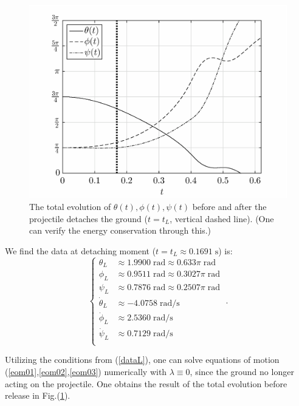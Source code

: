 \documentclass[%
reprint,
amsmath,amssymb,
aps,
]{revtex4-1}
\begin{document}
	\begin{figure}[h]
		\centering
		\includegraphics[scale=0.34]{ulttot.eps}
		\caption{The total evolution of $\theta(t),\phi(t),\psi(t)$ before and after the projectile detaches the ground ($t = t_L$, vertical dashed line). (One can verify the energy conservation through this.)} 
		\label{ultddyn}
	\end{figure}
	
	We find the data at detaching moment ($t=t_L\approx 0.1691\;\mathrm{s}$) is:
	\begin{equation}\label{dataL}
	\left\{
	\begin{aligned}
	\theta_L &\approx 1.9900\;\mathrm{rad} \approx 0.633\pi\;\mathrm{rad}
	\\
	\phi_L &\approx 0.9511\;\mathrm{rad}\approx 0.3027\pi\;\mathrm{rad}
	\\
	\psi_L &\approx 0.7876\;\mathrm{rad} \approx 0.2507\pi\;\mathrm{rad}
	\\
	\dot{\theta}_L &\approx -4.0758\;\mathrm{rad/s}\\
	\dot{\phi}_L &\approx 2.5360\;\mathrm{rad/s}\\
	\dot{\psi}_L &\approx 0.7129\;\mathrm{rad/s}\\
	\end{aligned}\right.\;.
	\end{equation}
	
	Utilizing the conditions from (\ref{dataL}), one can solve equations of motion (\ref{eom01},\ref{eom02},\ref{eom03}) numerically with $\lambda \equiv 0$, since the ground no longer acting on the projectile. One obtains the result of the total evolution before release in Fig.(\ref{ultddyn}).
	
\end{document}
